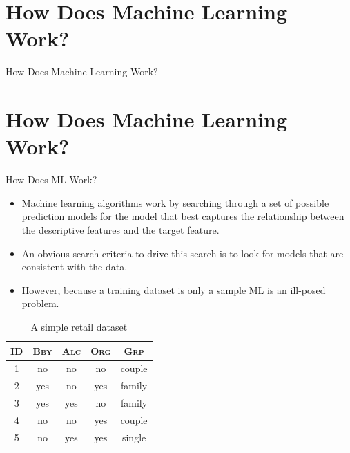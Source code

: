 \documentclass[xcolor={table}]{beamer}
\newcommand{\SectionSlideShortHeader}[3][]{
	\ifthenelse{\isempty{#1}}
		{\section[#3]{#2}\begin{frame} \begin{center}\begin{huge}#2\end{huge}\end{center}\end{frame}}
		{\section[#1]{#2}\begin{frame} \begin{center}\begin{huge}#3\end{huge}\end{center}\end{frame}}
}
\newcommand{\featN}[1]{\textsc{#1}}
\begin{document}
\SectionSlideShortHeader{How Does Machine Learning Work?}{How Does ML Work?}

\begin{frame}
\begin{itemize}
	\item<1-3> Machine learning algorithms work by searching through a set of possible prediction models for the model that best captures the relationship between the descriptive features and the target feature.
	\item<2-3> An obvious search criteria to drive this search is to look for models that are \alert{consistent} with the data.
	\item<3> However,  because a training dataset is only a sample ML is an \alert{ill-posed} problem.
	\end{itemize}
\end{frame}

 \begin{frame} 
\begin{table}[htb]
\caption{A simple retail dataset}
\label{table:retailDataset}
\centering
\begin{footnotesize}
\begin{tabular}{ c c c c c }
\hline
\featN{ID}	 & \featN{Bby} 	 & \featN{Alc}	& \featN{Org}  & \featN{Grp} \\
\hline
1	&	no	&	no	&	no	&	couple	\\
2	&	yes	&	no	&	yes	&	family	\\
3	&	yes	&	yes	&	no	&	family	\\
4	&	no	&	no	&	yes	&	couple	\\
5	&	no	&	yes	&	yes	&	single	\\
\hline 
\end{tabular}
\end{footnotesize}
\end{table}
\end{frame} 
\end{document}
